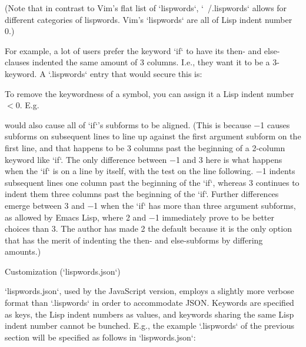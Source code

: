(Note that in contrast
to Vim’s flat list of `lispwords`, `~/.lispwords`
allows for different categories of lispwords.  Vim’s `lispwords` are
all of Lisp indent number 0.)

For example, a lot of users prefer the keyword `if` to have its then-
and else-clauses indented the same amount of 3 columns.  I.e.,
they want it to be a 3-keyword.  A `.lispwords` entry that would
secure this is:

To remove the keywordness of a symbol, you can assign it a Lisp indent
number $< 0$.  E.g.

would also cause all of `if`’s subforms to be aligned.  (This is because
−1 causes subforms on subsequent lines to line up against the first
argument subform on the first line, and that happens to be 3 columns
past the beginning of a 2-column keyword like `if`.  The only difference
between −1 and 3 here is what happens when the `if` is on a line by
itself, with the test on the line following.  −1 indents subsequent
lines one column past the beginning of the `if`, whereas 3 continues to
indent them three columns past the beginning of the `if`.  Further
differences emerge between 3 and −1 when the `if` has more than three
argument subforms, as allowed by Emacs Lisp, where 2 and −1 immediately
prove to be better choices than 3.  The author has made 2 the default
because it is the only option that has the merit of indenting the then-
and else-subforms by differing amounts.)

\beginsection Customization (`lispwords.json`)

`lispwords.json`, used by the JavaScript version, employs a slightly more verbose format
than `.lispwords` in order to accommodate JSON. Keywords are
specified as keys, the Lisp indent numbers as values, and
keywords sharing the same Lisp indent number cannot be bunched.
E.g., the example `.lispwords` of the previous section will
be specified as follows in `lispwords.json`:


\bye
